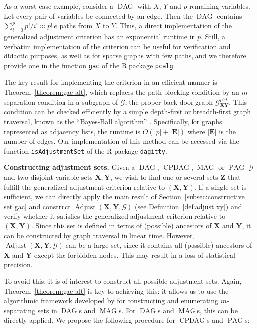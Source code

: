 \documentclass[11pt,a4paper]{article}
\newcommand{\bX}{\mathbf{X}}
\newcommand{\bY}{\mathbf{Y}}
\newcommand{\bZ}{\mathbf{Z}}
\DeclareMathOperator{\CPDAG}{CPDAG}
\DeclareMathOperator{\DAG}{DAG}
\DeclareMathOperator{\MAG}{MAG}
\DeclareMathOperator{\PAG}{PAG}
\DeclareMathOperator{\Adjust}{Adjust}
\newcommand{\g}[1][G]{\mathcal{#1}}
\newcommand{\gpbd}[2][G]{\mathcal{#1}_{\mathbf{#2}}^{pbd}}
\newcommand{\adjustb}[2][X,Y]{\Adjust(\mathbf{#1},#2)}
\begin{document}
As a worst-case example, consider a $\DAG$ with $X$, $Y$ and $p$ remaining variables. Let every pair of variables be connected by an edge. Then the $\DAG$ contains $\sum_{i=0}^p p! / i! \approx p!\,e$ paths from $X$ to $Y$. Thus, a direct implementation of the generalized adjustment criterion has an exponential runtime in $p$. Still, a verbatim implementation of the criterion can be useful for verification and  didactic purposes, as well as for sparse graphs with few paths, and we therefore provide one in the function \texttt{gac} of the R package \texttt{pcalg}.

The key result for implementing the criterion in an efficient manner is Theorem~\ref{theorem:gac-alt}, which replaces the path blocking condition by an $m$-separation condition in a subgraph of $\g$, the proper back-door graph $\gpbd{\mathbf{XY}}$. This condition can be checked efficiently by a simple depth-first or breadth-first graph traversal, known as the ``Bayes-Ball algorithm'' \citep{Shachter1998}. 
Specifically, for graphs represented as adjacency lists, the runtime is $O(|p|+|\mathbf{E}|)$ where $|\mathbf{E}|$ is the number of edges. Our implementation of this method can be accessed via the function \texttt{isAdjustmentSet} of the R package \texttt{dagitty}.

\textbf{Constructing adjustment sets.} Given a $\DAG$, $\CPDAG$, $\MAG$ or $\PAG$ $\g$ and two disjoint variable sets $\bX,\bY$, we wish to find one or several sets $\bZ$ that fulfill the generalized adjustment criterion relative to $(\bX,\bY)$. If a single set is sufficient, we can directly apply the main result of Section~\ref{subsec:constructive set gac} and construct $\adjustb{\g}$ (see Definition~\ref{def:adjust xy}) and verify whether it satisfies the generalized adjustment criterion relative to $(\bX,\bY)$. Since this set is defined in terms of (possible) ancestors of $\bX$ and $\bY$, it can be constructed by graph traversal in linear time. However, $\adjustb{\g}$ can be a large set, since it contains all (possible) ancestors of $\bX$ and $\bY$ except the forbidden nodes. This may result in a loss of statistical precision.

To avoid this, it is of interest to construct all possible adjustment sets. 
Again, Theorem~\ref{theorem:gac-alt} is key to achieving this: it allows us to use the algorithmic framework developed by \citet{vanconstructing} for constructing and enumerating $m$-separating sets in $\DAG$s and $\MAG$s. For $\DAG$s and $\MAG$s, this can be directly applied. We propose the following procedure for $\CPDAG$s and $\PAG$s:
\end{document}
